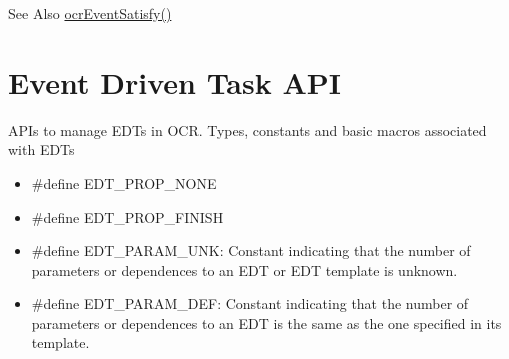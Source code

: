 \begin{DoxySeeAlso}{See Also}
\hyperlink{group__OCREvents_gab27ef5d905c01ba534e86f8e7e91eaf0}{ocr\-Event\-Satisfy()}
\end{DoxySeeAlso}



\hypertarget{group__OCREDT}{\section{Event Driven Task A\-P\-I}
\label{group__OCREDT}
}


A\-P\-Is to manage E\-D\-Ts in O\-C\-R.  
Types, constants and basic macros associated with EDTs
\begin{itemize}
\item \#define EDT\_PROP\_NONE  
\item \#define EDT\_PROP\_FINISH  
\item \#define EDT\_PARAM\_UNK: Constant indicating that the number of parameters or dependences to an EDT or EDT template is
unknown.
\item \#define EDT\_PARAM\_DEF: Constant indicating that the number of parameters or dependences to an EDT is the same as the one
specified in its template.
\end{itemize}

